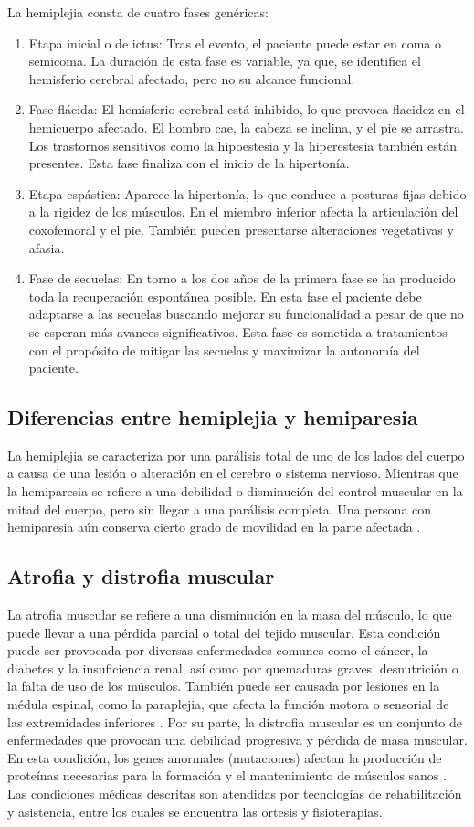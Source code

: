 La hemiplejia consta de cuatro fases genéricas:
\begin{enumerate}
	\item Etapa inicial o de ictus: Tras el evento, el paciente puede estar en coma o semicoma. La duración de esta fase es variable, ya que, se identifica el hemisferio cerebral afectado, pero no su alcance funcional.
	\item Fase flácida: El hemisferio cerebral está inhibido, lo que provoca flacidez en el hemicuerpo afectado. El hombro cae, la cabeza se inclina, y el pie se arrastra. Los trastornos sensitivos como la hipoestesia y la hiperestesia también están presentes. Esta fase finaliza con el inicio de la hipertonía.
	\item	Etapa espástica: Aparece la hipertonía, lo que conduce a posturas fijas debido a la rigidez de los músculos. En el miembro inferior afecta la articulación del coxofemoral y el pie. También pueden presentarse alteraciones vegetativas y afasia.
	\item	Fase de secuelas: En torno a los dos años de la primera fase se ha producido toda la recuperación espontánea posible. En esta fase el paciente debe adaptarse a las secuelas buscando mejorar su funcionalidad a pesar de que no se esperan más avances significativos. Esta fase es sometida a tratamientos con el propósito de mitigar las secuelas y maximizar la autonomía del paciente.
\end{enumerate}
\subsection{Diferencias entre hemiplejia y hemiparesia}
La hemiplejia se caracteriza por una parálisis total de uno de los lados del cuerpo a causa de una lesión o alteración en el cerebro o sistema nervioso. Mientras que la hemiparesia se refiere a una debilidad o disminución del control muscular en la mitad del cuerpo, pero sin llegar a una parálisis completa. Una persona con hemiparesia aún conserva cierto grado de movilidad en la parte afectada \cite{18}. 
\subsection{Atrofia y distrofia muscular }
La atrofia muscular se refiere a una disminución en la masa del músculo, lo que puede llevar a una pérdida parcial o total del tejido muscular. Esta condición puede ser provocada por diversas enfermedades comunes como el cáncer, la diabetes y la insuficiencia renal, así como por quemaduras graves, desnutrición o la falta de uso de los músculos. También puede ser causada por lesiones en la médula espinal, como la paraplejia, que afecta la función motora o sensorial de las extremidades inferiores \cite{19}. Por su parte, la distrofia muscular es un conjunto de enfermedades que provocan una debilidad progresiva y pérdida de masa muscular. En esta condición, los genes anormales (mutaciones) afectan la producción de proteínas necesarias para la formación y el mantenimiento de músculos sanos \cite{19}. Las condiciones médicas descritas son atendidas por tecnologías de rehabilitación y asistencia, entre los cuales se encuentra las ortesis y fisioterapias. 
